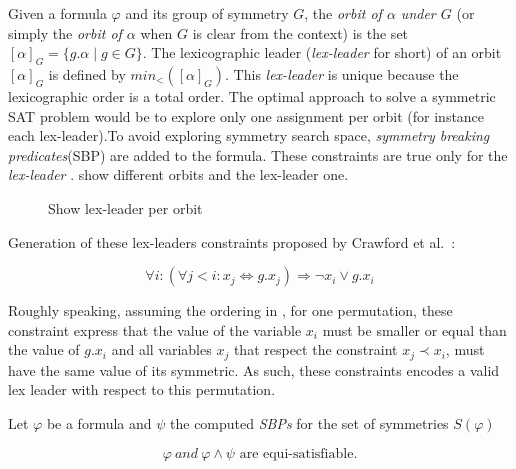 Given a formula $\varphi$ and its group of symmetry $G$,
the \emph{orbit of $\alpha$ under $G$} (or
simply the \emph{orbit of $\alpha$} when $G$ is clear from the context) is the set
$ [\alpha]_G=\{ g.\alpha \mid g \in G \}$. 
The lexicographic leader (\textit{lex-leader} for short) of an orbit $[\alpha]_G$ is defined by
$min_<([\alpha]_G)$. This \textit{lex-leader} is unique because the lexicographic
order is a total order.
The optimal approach to solve a symmetric SAT problem would be to explore
only one assignment per orbit (for instance each lex-leader).To avoid exploring 
symmetry search space, \emph{symmetry breaking predicates}(SBP) are added to the formula.
These constraints are true only for the \emph{lex-leader} \cite{crawford1996symmetry}.
 show different orbits and the lex-leader one.

\begin{figure}[!htbp]
	\centering
	
	\caption{Show lex-leader per orbit}
	\label{fig:lex-leader}
\end{figure}




Generation of these lex-leaders constraints proposed by Crawford et al.~\cite{crawford1996symmetry}:

$$\forall i : (\forall j < i : x_j \Leftrightarrow g.x_j) \Rightarrow \neg x_i \vee g.x_i$$

Roughly speaking, assuming the ordering in , for one permutation, these constraint express that 
the value of the variable $x_i$ must be smaller or equal than the value of $g.x_i$ and all variables $x_j$ that respect the constraint
$x_j \prec x_i$,  must have the same value of its symmetric. As such, these constraints encodes a valid lex leader with respect to 
this permutation. 



\begin{figure}

\end{figure}







\begin{theorem}
	\label{theorem:satisfiability_preservation_SBPs}
	Let $\varphi$ be a formula and $\psi$ the computed \textit{SBPs} for the set of
	symmetries $S(\varphi)$
	
	$$\varphi~and ~\varphi \wedge \psi \text{ are equi-satisfiable}.$$
\end{theorem}

